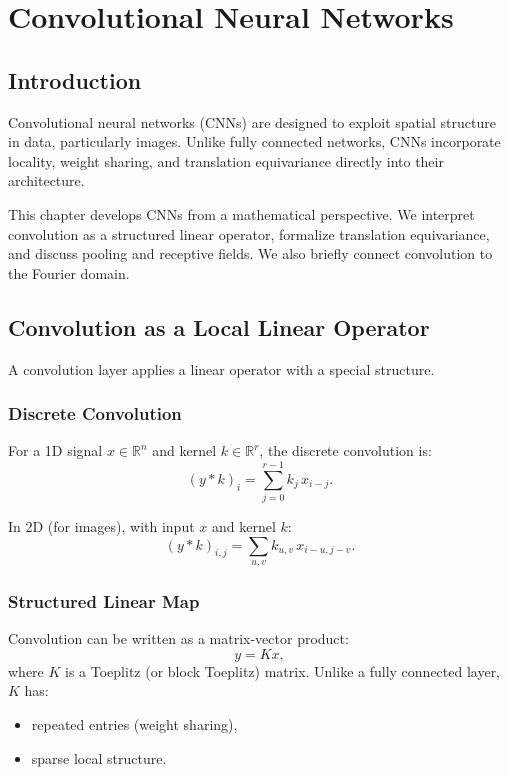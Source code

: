 \chapter{Convolutional Neural Networks}

\section{Introduction}

Convolutional neural networks (CNNs) are designed to exploit spatial structure in data, particularly images. Unlike fully connected networks, CNNs incorporate locality, weight sharing, and translation equivariance directly into their architecture.

This chapter develops CNNs from a mathematical perspective. We interpret convolution as a structured linear operator, formalize translation equivariance, and discuss pooling and receptive fields. We also briefly connect convolution to the Fourier domain.

\section{Convolution as a Local Linear Operator}

A convolution layer applies a linear operator with a special structure.

\subsection{Discrete Convolution}

For a 1D signal $x \in \mathbb{R}^n$ and kernel $k \in \mathbb{R}^r$, the discrete convolution is:
\[
(y * k)_i = \sum_{j=0}^{r-1} k_j \, x_{i-j}.
\]

In 2D (for images), with input $x$ and kernel $k$:
\[
(y * k)_{i,j} = \sum_{u,v} k_{u,v} \, x_{i-u, j-v}.
\]

\subsection{Structured Linear Map}

Convolution can be written as a matrix-vector product:
\[
y = K x,
\]
where $K$ is a Toeplitz (or block Toeplitz) matrix. Unlike a fully connected layer, $K$ has:
\begin{itemize}
    \item repeated entries (weight sharing),
    \item sparse local structure.
\end{itemize}

